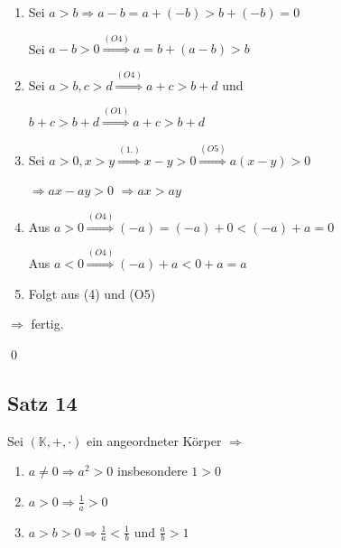 \documentclass[fleqn]{scrbook}
\renewenvironment{proof}{{\bfseries Beweis }}{\qed}
\begin{document}
\begin{proof}

\begin{enumerate}
  \item Sei $a>b \Longrightarrow a-b=a+(-b)>b+(-b)=0$
  
    Sei $a-b>0 \stackrel{(O4)}{\Longrightarrow} a= b+(a-b)>b$
    
  \item Sei $a>b,c>d \stackrel{(O4)}{\Longrightarrow} a+c>b+d$ und
  
    $b+c>b+d \stackrel{(O1)}{\Longrightarrow} a+c>b+d$
    
  \item Sei $a>0,x>y \stackrel{(1.)}{\Longrightarrow} x-y>0 \stackrel{(O5)}{\Longrightarrow} a(x-y)>0$
  
    $\Longrightarrow ax-ay >0$
    $\Longrightarrow ax >ay$
  \item Aus $a>0 \stackrel{(O4)}{\Longrightarrow} (-a)=(-a)+0<(-a)+a=0$
  
    Aus $a<0 \stackrel{(O4)}{\Longrightarrow} (-a)+a<0+a=a$
    
  \item Folgt aus (4) und (O5)
\end{enumerate}

$\Longrightarrow$ fertig.

\end{proof}

\subsection{Satz 14}

Sei $(\mathbb{K},+, \cdot )$ ein angeordneter Körper $\Longrightarrow$

\begin{enumerate}
  \item $a \neq 0 \Longrightarrow a^2>0$ insbesondere $1>0$
  
  \item $a > 0 \Longrightarrow \frac{1}{a}>0$
  
  \item $a > b > 0 \Longrightarrow \frac{1}{a}<\frac{1}{b}$ und $\frac{a}{b}>1$
\end{enumerate}
\end{document}

